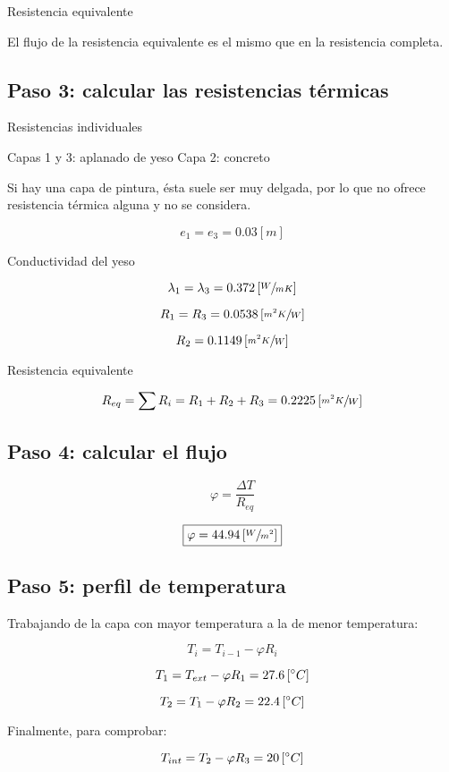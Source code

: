 \documentclass[12pt]{article}
\begin{document}
Resistencia equivalente

El flujo de la resistencia equivalente es el mismo que en la resistencia completa.

\subsection{Paso 3: calcular las resistencias térmicas}

Resistencias individuales

Capas 1 y 3: aplanado de yeso
Capa 2: concreto

Si hay una capa de pintura, ésta suele ser muy delgada, por lo que no ofrece resistencia térmica alguna y no se considera.

\[ e_1 = e_3 = 0.03 \left[ m \right] \]

Conductividad del yeso

\[ \lambda _1 = \lambda _3 = 0.372 \left[ \sfrac{ W }{ m K } \right] \]

\[ R_1 = R_3 = 0.0538 \left[ \sfrac{ m ^ 2 K }{ W } \right] \]

\[ R_2 = 0.1149 \left[ \sfrac{ m ^ 2 K }{ W } \right] \]

Resistencia equivalente

\[ R_{ eq } = \sum{ R_i } = R_1 + R_2 + R_3 = 0.2225 \left[ \sfrac{ m ^ 2 K }{ W } \right] \]

\subsection{Paso 4: calcular el flujo}

\[ \varphi = \frac{ \Delta T }{ R_{ eq } } \]

\[ \boxed{ \varphi = 44.94 \left[ \sfrac{ W }{ m ^ 2 } \right] } \]

\subsection{Paso 5: perfil de temperatura}

Trabajando de la capa con mayor temperatura a la de menor temperatura:

\[ T_i = T_{ i - 1 } - \varphi R_i \]

\[ T_1 = T_{ ext } - \varphi R_1 = 27.6 \left[ \degree C \right] \]

\[ T_2 = T_{ 1 } - \varphi R_2 = 22.4 \left[ \degree C \right] \]

Finalmente, para comprobar:

\[ T_{ int } = T_{ 2 } - \varphi R_3 = 20 \left[ \degree C \right] \]
\end{document}
